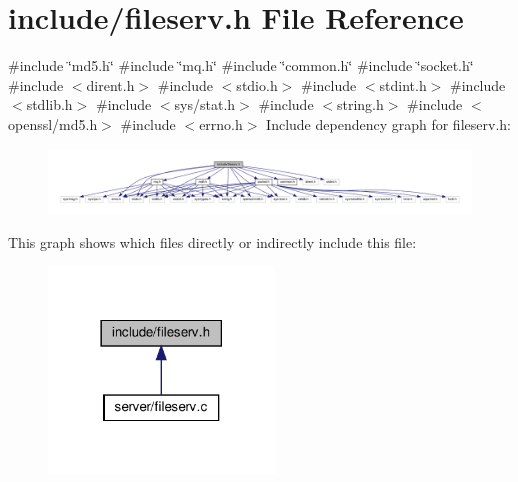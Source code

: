 \section{include/fileserv.h File Reference}
\label{fileserv_8h}
{\ttfamily \#include \char`\"{}md5.\+h\char`\"{}}\newline
{\ttfamily \#include \char`\"{}mq.\+h\char`\"{}}\newline
{\ttfamily \#include \char`\"{}common.\+h\char`\"{}}\newline
{\ttfamily \#include \char`\"{}socket.\+h\char`\"{}}\newline
{\ttfamily \#include $<$dirent.\+h$>$}\newline
{\ttfamily \#include $<$stdio.\+h$>$}\newline
{\ttfamily \#include $<$stdint.\+h$>$}\newline
{\ttfamily \#include $<$stdlib.\+h$>$}\newline
{\ttfamily \#include $<$sys/stat.\+h$>$}\newline
{\ttfamily \#include $<$string.\+h$>$}\newline
{\ttfamily \#include $<$openssl/md5.\+h$>$}\newline
{\ttfamily \#include $<$errno.\+h$>$}\newline
Include dependency graph for fileserv.\+h\+:
\nopagebreak
\begin{figure}[H]
\begin{center}
\leavevmode
\includegraphics[width=350pt]{fileserv_8h__incl}
\end{center}
\end{figure}
This graph shows which files directly or indirectly include this file\+:\nopagebreak
\begin{figure}[H]
\begin{center}
\leavevmode
\includegraphics[width=170pt]{fileserv_8h__dep__incl}
\end{center}
\end{figure}
